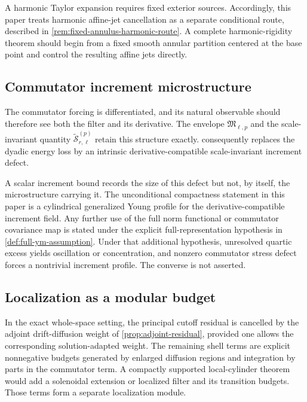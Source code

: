 \documentclass[11pt]{article}
\numberwithin{equation}{section}
\theoremstyle{plain}
\theoremstyle{definition}
\theoremstyle{remark}
\begin{document}
A harmonic Taylor expansion requires fixed exterior sources.  Accordingly, this paper treats harmonic affine-jet cancellation as a separate conditional route, described in \cref{rem:fixed-annulus-harmonic-route}.  A complete harmonic-rigidity theorem should begin from a fixed smooth annular partition centered at the base point and control the resulting affine jets directly.

\subsection{Commutator increment microstructure}

The commutator forcing is differentiated, and its natural observable should therefore see both the filter and its derivative.  The envelope $\mathfrak M_{\ell,p}$ and the scale-invariant quantity $\widetilde{\mathcal S}^{(p)}_{r,\ell}$ retain this structure exactly.   consequently replaces the dyadic energy loss by an intrinsic derivative-compatible scale-invariant increment defect.

A scalar increment bound records the size of this defect but not, by itself, the microstructure carrying it.  The unconditional compactness statement in this paper is a cylindrical generalized Young profile for the derivative-compatible increment field.  Any further use of the full norm functional or commutator covariance map is stated under the explicit full-representation hypothesis in \cref{def:full-ym-assumption}.  Under that additional hypothesis, unresolved quartic excess yields oscillation or concentration, and nonzero commutator stress defect forces a nontrivial increment profile.  The converse is not asserted.

\subsection{Localization as a modular budget}

In the exact whole-space setting, the principal cutoff residual is cancelled by the adjoint drift-diffusion weight of \cref{prop:adjoint-residual}, provided one allows the corresponding solution-adapted weight.  The remaining shell terms are explicit nonnegative budgets generated by enlarged diffusion regions and integration by parts in the commutator term.  A compactly supported local-cylinder theorem would add a solenoidal extension or localized filter and its transition budgets.  Those terms form a separate localization module.
\end{document}
